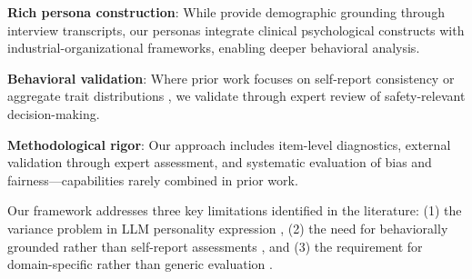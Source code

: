\documentclass[11pt]{article}
\begin{document}
\noindent \textbf{Rich persona construction}: While \citet{park2024generative} provide demographic grounding through interview transcripts, our personas integrate clinical psychological constructs with industrial-organizational frameworks, enabling deeper behavioral analysis.
    
\noindent \textbf{Behavioral validation}: Where prior work focuses on self-report consistency \citep{lee2025llms} or aggregate trait distributions \citep{problem_variance_1}, we validate through expert review of safety-relevant decision-making.
    
\noindent \textbf{Methodological rigor}: Our approach includes item-level diagnostics, external validation through expert assessment, and systematic evaluation of bias and fairness—capabilities rarely combined in prior work.

Our framework addresses three key limitations identified in the literature: (1) the variance problem in LLM personality expression \citep{problem_variance_1,kwok2024evaluating}, (2) the need for behaviorally grounded rather than self-report assessments \citep{problem_agree_both}, and (3) the requirement for domain-specific rather than generic evaluation \citep{mittelstadt2024large}.
\end{document}

